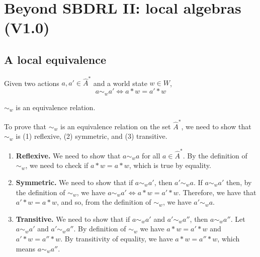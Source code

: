\chapter{
Beyond SBDRL II: local algebras
(V1.0)
}

\section{
A local equivalence
}

\begin{definition}
	Given two actions $a, a' \in \hat{A}^{*}$ and a world state $w \in W$,
	\begin{equation}
		a \sim_{w} a' \iff a \ast w = a' \ast w
	\end{equation}
\end{definition}

\begin{propositionE}
    $\sim_{w}$ is an equivalence relation.
\end{propositionE}
\begin{proofE}
    To prove that $\sim_{w}$ is an equivalence relation on the set $\hat{A}^{*}$, we need to show that $\sim_{w}$ is (1) reflexive, (2) symmetric, and (3) transitive.
    \begin{enumerate}[(1)]
        \item \textbf{Reflexive.}
        We need to show that $a \sim_{w} a$ for all $a \in \hat{A}^{*}$.
        By the definition of $\sim_{w}$, we need to check if $a \ast w = a \ast w$, which is true by equality.

        \item \textbf{Symmetric.}
        We need to show that if $a \sim_{w} a'$, then $a' \sim_{w} a$.
        If $a \sim_{w} a'$ then, by the definition of $\sim_{w}$, we have $a \sim_{w} a' \iff a \ast w = a' \ast w$.
        Therefore, we have that $a' \ast w = a \ast w$, and so, from the definition of $\sim_{w}$, we have $a' \sim_{w} a$.

        \item \textbf{Transitive.}
        We need to show that if $a \sim_{w} a'$ and $a' \sim_{w} a''$, then $a \sim_{w} a''$.
        Let $a \sim_{w} a'$ and $a' \sim_{w} a''$.
        By definition of $\sim_{w}$ we have $a \ast w = a' \ast w$ and $a' \ast w = a'' \ast w$.
        By transitivity of equality, we have $a \ast w = a'' \ast w$, which means $a \sim_{w} a''$.
    \end{enumerate}
\end{proofE}

